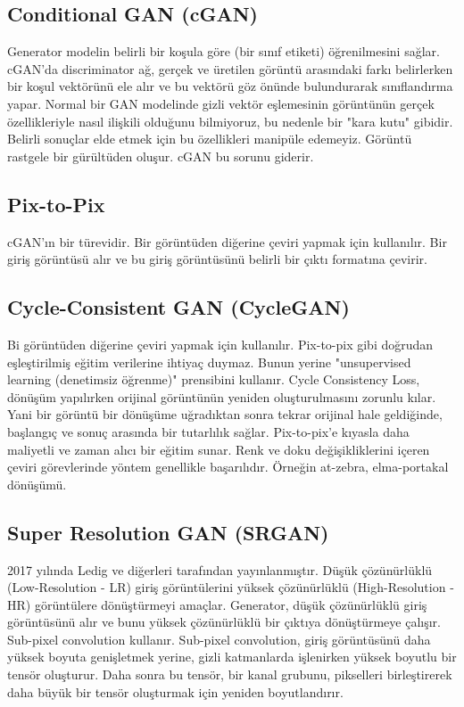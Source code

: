\subsection{Conditional GAN (cGAN)}
Generator modelin belirli bir koşula göre (bir sınıf etiketi) öğrenilmesini sağlar. cGAN'da discriminator ağ, gerçek ve üretilen görüntü arasındaki farkı belirlerken bir koşul vektörünü ele alır ve bu vektörü göz önünde bulundurarak sınıflandırma yapar. Normal bir GAN modelinde gizli vektör eşlemesinin görüntünün gerçek özellikleriyle nasıl ilişkili olduğunu bilmiyoruz, bu nedenle bir "kara kutu" gibidir. Belirli sonuçlar elde etmek için bu özellikleri manipüle edemeyiz. Görüntü rastgele bir gürültüden oluşur. cGAN bu sorunu giderir.

\subsection{Pix-to-Pix}
cGAN'ın bir türevidir. Bir görüntüden diğerine çeviri yapmak için kullanılır. Bir giriş görüntüsü alır ve bu giriş görüntüsünü belirli bir çıktı formatına çevirir. 

\subsection{Cycle-Consistent GAN (CycleGAN)}
Bi görüntüden diğerine çeviri yapmak için kullanılır. Pix-to-pix gibi doğrudan eşleştirilmiş eğitim verilerine ihtiyaç duymaz. Bunun yerine "unsupervised learning (denetimsiz öğrenme)" prensibini kullanır. Cycle Consistency Loss, dönüşüm yapılırken orijinal görüntünün yeniden oluşturulmasını zorunlu kılar. Yani bir görüntü bir dönüşüme uğradıktan sonra tekrar orijinal hale geldiğinde, başlangıç ve sonuç arasında bir tutarlılık sağlar. Pix-to-pix'e kıyasla daha maliyetli ve zaman alıcı bir eğitim sunar. Renk ve doku değişikliklerini içeren çeviri görevlerinde yöntem genellikle başarılıdır. Örneğin at-zebra, elma-portakal dönüşümü.

\subsection{Super Resolution GAN (SRGAN)}
2017 yılında Ledig ve diğerleri tarafından yayınlanmıştır. Düşük çözünürlüklü (Low-Resolution - LR) giriş görüntülerini yüksek çözünürlüklü (High-Resolution - HR) görüntülere dönüştürmeyi amaçlar. Generator, düşük çözünürlüklü giriş görüntüsünü alır ve bunu yüksek çözünürlüklü bir çıktıya dönüştürmeye çalışır. Sub-pixel convolution kullanır. Sub-pixel convolution, giriş görüntüsünü daha yüksek boyuta genişletmek yerine, gizli katmanlarda işlenirken yüksek boyutlu bir tensör oluşturur. Daha sonra bu tensör, bir kanal grubunu, pikselleri birleştirerek daha büyük bir tensör oluşturmak için yeniden boyutlandırır.

